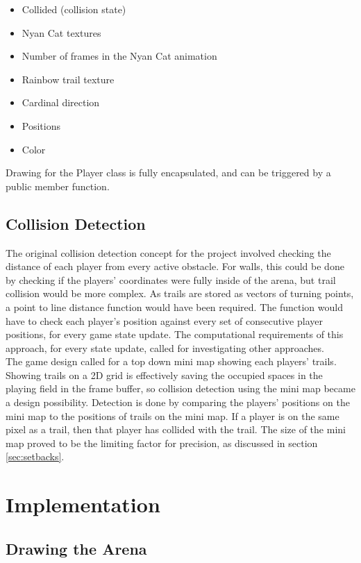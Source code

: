 \documentclass[12pt]{article}
\begin{document}
\begin{itemize}
\item Collided (collision state)
\item Nyan Cat textures
\item Number of frames in the Nyan Cat animation
\item Rainbow trail texture
\item Cardinal direction
\item Positions
\item Color
\end{itemize}

Drawing for the Player class is fully encapsulated, and can be triggered by a public member function.

\subsection{Collision Detection}

The original collision detection concept for the project involved checking the distance of each player from every active obstacle.  For walls, this could be done by checking if the players' coordinates were fully inside of the arena, but trail collision would be more complex.  As trails are stored as vectors of turning points, a point to line distance function would have been required.  The function would have to check each player's position against every set of consecutive player positions, for every game state update.  The computational requirements of this approach, for every state update, called for investigating other approaches.  \\

The game design called for a top down mini map showing each players' trails.  Showing trails on a 2D grid is effectively saving the occupied spaces in the playing field in the frame buffer, so collision detection using the mini map became a design possibility.  Detection is done by comparing the players' positions on the mini map to the positions of trails on the mini map.  If a player is on the same pixel as a trail, then that player has collided with the trail.  The size of the mini map proved to be the limiting factor for precision, as discussed in section \ref{sec:setbacks}.

\section{Implementation}

\subsection{Drawing the Arena}
\end{document}
